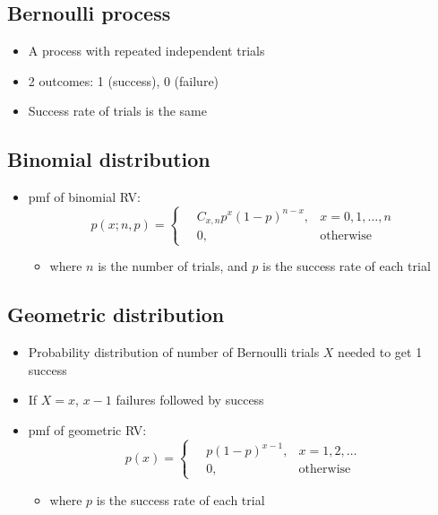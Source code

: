 \documentclass[a4paper]{article}
\begin{document}
\subsection{Bernoulli process}
\begin{itemize}
    \item A process with repeated independent trials
    \item 2 outcomes: 1 (success), 0 (failure)
    \item Success rate of trials is the same
\end{itemize}
\subsection{Binomial distribution}
\begin{itemize}
    \item pmf of binomial RV:
    $$p(x;n,p) = \begin{cases}
    \quad C_{x, n}p^{x}(1-p)^{n-x},&\mbox{}x = 0, 1, \ldots, n\\
    \quad 0, &\mbox{otherwise}
    \end{cases}
    $$
    \begin{itemize}[label=$\circ$]
        \item where $n$ is the number of trials, and $p$ is the success rate of each trial
    \end{itemize}
\end{itemize}
\subsection{Geometric distribution}
\begin{itemize}
    \item Probability distribution of number of Bernoulli trials $X$ needed to get 1 success
    \item If $X = x$, $x-1$ failures followed by success
    \item pmf of geometric RV:
    $$p(x) = \begin{cases}
    \quad p(1-p)^{x-1},&\mbox{}x = 1, 2, \ldots\\
    \quad 0, &\mbox{otherwise}
    \end{cases}
    $$
    \begin{itemize}[label=$\circ$]
        \item where $p$ is the success rate of each trial
    \end{itemize}
\end{itemize}
\end{document}
